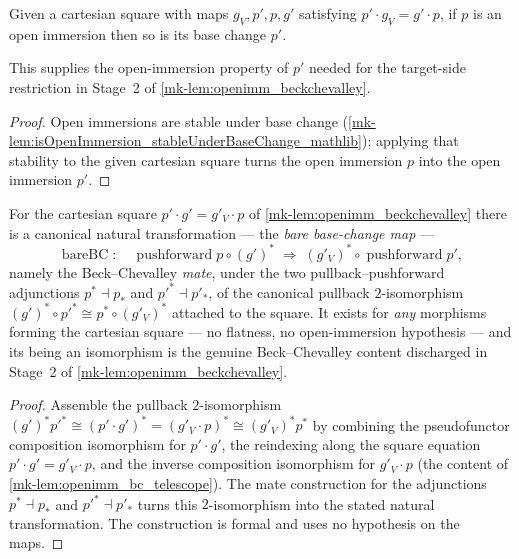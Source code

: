 \begin{lemma}
  \label{mk-lem:isOpenImmersion_of_isPullback_left}

  Given a cartesian square with maps \(g_V, p', p, g'\) satisfying \(p' \cdot g_V = g'
  \cdot p\), if \(p\) is an open immersion then so is its base change \(p'\).

  This supplies the open-immersion property of \(p'\) needed for the target-side restriction in
  Stage~2 of \ref{mk-lem:openimm_beckchevalley}.
\end{lemma}
\begin{proof}
  Open immersions are stable under base change
  (\ref{mk-lem:isOpenImmersion_stableUnderBaseChange_mathlib}); applying that stability to the given
  cartesian square turns the open immersion \(p\) into the open immersion \(p'\).
\end{proof}

\begin{lemma}\label{mk-lem:openimm_bareBC}
  \leanok

  For the cartesian square \(p' \cdot g' = g'_V \cdot p\) of \ref{mk-lem:openimm_beckchevalley} there
  is a canonical natural transformation --- the \emph{bare base-change map} ---
  \[
    \operatorname{bareBC} \colon\quad
    \operatorname{pushforward} p \circ (g')^*
      \;\Longrightarrow\;
    (g'_V)^* \circ \operatorname{pushforward} p',
  \]
  namely the Beck--Chevalley \emph{mate}, under the two pullback--pushforward adjunctions
  \(p^* \dashv p_*\) and \(p'^* \dashv p'_*\), of the canonical pullback \(2\)-isomorphism
  \((g')^* \circ p'^* \cong p^* \circ (g'_V)^*\) attached to the square. It exists for \emph{any}
  morphisms forming the cartesian square --- no flatness, no open-immersion hypothesis --- and its
  being an isomorphism is the genuine Beck--Chevalley content discharged in Stage~2 of
  \ref{mk-lem:openimm_beckchevalley}.
\end{lemma}
\begin{proof}
  Assemble the pullback \(2\)-isomorphism
  \((g')^* p'^* \cong (p' \cdot g')^* = (g'_V \cdot p)^* \cong (g'_V)^* p^*\) by combining
  the pseudofunctor composition isomorphism for \(p' \cdot g'\), the reindexing along the square
  equation \(p' \cdot g' = g'_V \cdot p\), and the inverse composition isomorphism for
  \(g'_V \cdot p\) (the content of \ref{mk-lem:openimm_bc_telescope}). The mate construction for the adjunctions \(p^* \dashv p_*\) and
  \(p'^* \dashv p'_*\) turns this \(2\)-isomorphism into the stated natural transformation. The
  construction is formal and uses no hypothesis on the maps.
\end{proof}

